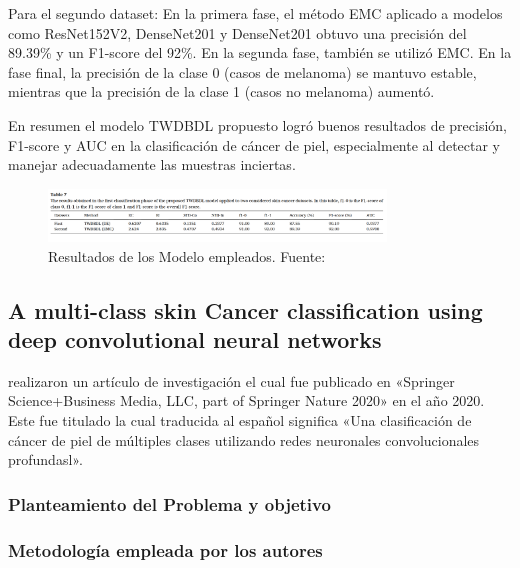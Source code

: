 Para el segundo dataset: En la primera fase, el método EMC aplicado a modelos como ResNet152V2, DenseNet201 y DenseNet201 obtuvo una precisión del 89.39\% y un F1-score del 92\%. En la segunda fase, también se utilizó EMC. En la fase final, la precisión de la clase 0 (casos de melanoma) se mantuvo estable, mientras que la precisión de la clase 1 (casos no melanoma) aumentó.

En resumen el modelo TWDBDL propuesto logró buenos resultados de precisión, F1-score y AUC en la clasificación de cáncer de piel, especialmente al detectar y manejar adecuadamente las muestras inciertas.

\begin{figure}[h]
	\begin{center}
		\includegraphics[width=0.8\textwidth]{2/figuras/Uncertainty_quantification_skin _imagen_01.png}
		\caption{Resultados de los Modelo empleados. Fuente: \cite{abdar2021uncertainty}}
		\label{1:fig}
	\end{center}
\end{figure}


\subsection{A multi-class skin Cancer classification using deep convolutional neural networks \citep*{chaturvedi2020multi}}
\citeauthor{chaturvedi2020multi} realizaron un artículo de investigación el cual fue publicado en «Springer Science+Business Media, LLC, part of Springer Nature 2020» en el año 2020. Este fue titulado  la cual traducida al español significa «Una clasificación de cáncer de piel de múltiples clases utilizando redes neuronales convolucionales profundasl».

\subsubsection{Planteamiento del Problema y objetivo}


\subsubsection{Metodología empleada por los autores}
\newcommand{\TUAMCone}{Recopilación de la data: Se uso los siguetes conjustos de datos: ISIC2017, ISIC2018, y HAM10000. Donde se realizó ajustes para asegurar que los datos estén en un formato adecuado para el entrenamiento de los modelos.
}

